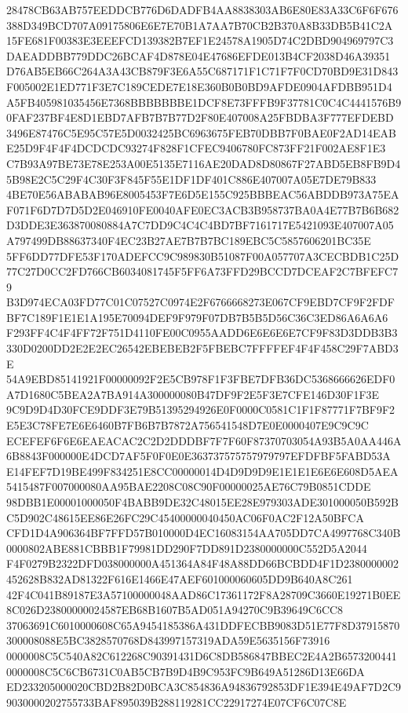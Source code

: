 \documentclass[UTF8,fontset=fandol,zihao=-4,a4paper]{ctexart}
\begin{document}
{{28478CB63AB757EEDDCB776D6DADFB4AA8838303AB6E80E83A33C6F6F676388D349BCD707A09175806E6E7E70B1A7AA7B70CB2B370A8B33DB5B41C2A
15FE681F00383E3EEEFCD139382B7EF1E24578A1905D74C2DBD904969797C3DAEADDBB779DDC26BCAF4D878E04E47686EFDE013B4CF2038D46A39351
D76AB5EB66C264A3A43CB879F3E6A55C687171F1C71F7F0CD70BD9E31D843F005002E1ED771F3E7C189CEDE7E18E360B0B0BD9AFDE0904AFDBB951D4
A5FB405981035456E7368BBBBBBBE1DCF8E73FFFB9F37781C0C4C4441576B90FAF237BF4E8D1EBD7AFB7B7B77D2F80E407008A25FBDBA3F777EFDEBD
3496E87476C5E95C57E5D0032425BC6963675FEB70DBB7F0BAE0F2AD14EABE25D9F4F4F4DCDCDC93274F828F1CFEC9406780FC873FF21F002AE8F1E3
C7B93A97BE73E78E253A00E5135E7116AE20DAD8D80867F27ABD5EB8FB9D45B98E2C5C29F4C30F3F845F55E1DF1DF401C886E407007A05E7DE79B833
4BE70E56ABABAB96E8005453F7E6D5E155C925BBBEAC56ABDDB973A75EAF071F6D7D7D5D2E046910FE0040AFE0EC3ACB3B958737BA0A4E77B7B6B682
D3DDE3E363870080884A7C7DD9C4C4C4BD7BF7161717E5421093E407007A05A797499DB88637340F4EC23B27AE7B7B7BC189EBC5C5857606201BC35E
5FF6DD77DFE53F170ADEFCC9C989830B51087F00A057707A3CECBDB1C25D77C27D0CC2FD766CB6034081745F5FF6A73FFD29BCCD7DCEAF2C7BFEFC79
B3D974ECA03FD77C01C07527C0974E2F6766668273E067CF9EBD7CF9F2FDFBF7C189F1E1E1A195E70094DEF9F979F07DB7B5B5D56C36C3ED86A6A6A6
F293FF4C4F4FF72F751D4110FE00C0955AADD6E6E6E6E7CF9F83D3DDB3B3330D0200DD2E2E2EC26542EBEBEB2F5FBEBC7FFFFEF4F4F458C29F7ABD3E
54A9EBD85141921F00000092F2E5CB978F1F3FBE7DFB36DC5368666626EDF0A7D1680C5BEA2A7BA914A300000080B47DF9F2E5F3E7CFE146D30F1F3E
9C9D9D4D30FCE9DDF3E79B51395294926E0F0000C0581C1F1F87771F7BF9F2E5E3C78FE7E6E6460B7FB6B7B7872A756541548D7E0E0000407E9C9C9C
ECEFEF6F6E6EAEACAC2C2D2DDDBF7F7F60F87370703054A93B5A0AA446A6B8843F000000E4DCD7AF5F0F0E0E363737575757979797EFDFBF5FABD53A
E14FEF7D19BE499F834251E8CC00000014D4D9D9D9E1E1E1E6E6E608D5AEA5415487F007000080AA95BAE2208C08C90F00000025AE76C79B0851CDDE
98DBB1E00001000050F4BABB9DE32C48015EE28E979303ADE301000050B592BC5D902C48615EE86E26FC29C45400000040450AC06F0AC2F12A50BFCA
CFD1D4A906364BF7FFD57B010000D4EC16083154AA705DD7CA4997768C340B0000802ABE881CBBB1F79981DD290F7DD891D2380000000C552D5A2044
F4F0279B2322DFD038000000A451364A84F48A88DD66BCBDD4F1D2380000002452628B832AD81322F616E1466E47AEF601000060605DD9B640A8C261
42F4C041B89187E3A57100000048AAD86C17361172F8A28709C3660E19271B0EE8C026D23800000024587EB68B1607B5AD051A94270C9B39649C6CC8
37063691C6010000608C65A9454185386A431DDFECBB9083D51E77F8D37915870300008088E5BC3828570768D843997157319ADA59E5635156F73916
0000008C5C540A82C612268C90391431D6C8DB586847BBEC2E4A2B65732004410000008C5C6CB6731C0AB5CB7B9D4B9C953FC9B649A51286D13E66DA
ED233205000020CBD2B82D0BCA3C854836A94836792853DF1E394E49AF7D2C99030000202755733BAF895039B288119281CC22917274E07CF6C07C8E
}}
\end{document}
